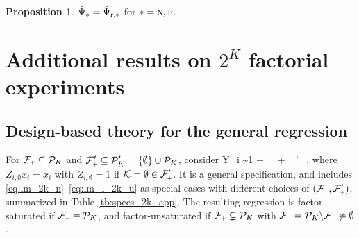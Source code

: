 \documentclass[11pt]{article}
\theoremstyle{definition}
\newtheorem{proposition}{Proposition}
\begin{document}
\begin{proposition}\label{prop:ehw_equiv}
$\hat\Psi_* = \hat\Psi_{\textup{r},*}$ for $* = \textsc{n}, \textsc{f}$.
\end{proposition}


\section{Additional results on $2^K$ factorial experiments}\label{sec:2k_app}

\subsection{Design-based theory for the general regression} \label{sec:2k_app_s}
For $\mfp \subseteq \pk$ and $\mfpp \subseteq \pk' = \{\emptyset\} \cup \pk$, consider 
\beginy\label{eq:lm_2k_g}
Y_i \sim 1 + \sum_{\mk \in \mfp} \zimks + \sum_{\mk \in \mfp'} \zimks \, \cxi, 
\endy 
where  $Z_{i, \emptyset}x_i = x_i$ with $Z_{i, \emptyset} = 1$ if $\mk = \emptyset \in \mfp'$. 
It is a general specification, and includes \eqref{eq:lm_2k_n}--\eqref{eq:lm_l_2k_u} as special cases with different choices of $(\mfp, \mfpp)$, summarized in Table \ref{tb:specs_2k_app}. 
The resulting regression is factor-saturated if $\mfp = \pk$, and factor-unsaturated if $\mfp \subsetneq \pk$ with $  \mfm  = \pk \backslash \mfp \neq \emptyset$.
\end{document}
